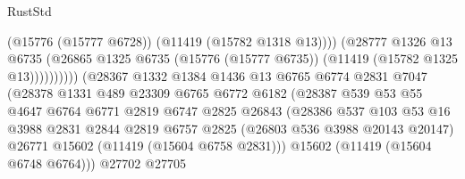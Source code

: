 \begin{lexlean}{RustStd}
\begin{coremodule}
                                              (@15776 (@15777 @6728))
                                              (@11419 (@15782 @1318 @13))))
                                          (@28777
                                            @1326
                                            @13
                                            @6735
                                            (@26865
                                              @1325
                                              @6735
                                              (@15776 (@15777 @6735))
                                              (@11419 (@15782 @1325 @13))))))))))
                              (@28367
                                @1332
                                @1384
                                @1436
                                @13
                                @6765
                                @6774
                                @2831
                                @7047
                                (@28378
                                  @1331
                                  @489
                                  @23309
                                  @6765
                                  @6772
                                  @6182
                                  (@28387
                                    @539
                                    @53
                                    @55
                                    @4647
                                    @6764
                                    @6771
                                    @2819
                                    @6747
                                    @2825
                                    @26843
                                    (@28386
                                      @537
                                      @103
                                      @53
                                      @16
                                      @3988
                                      @2831
                                      @2844
                                      @2819
                                      @6757
                                      @2825
                                      (@26803 @536 @3988 @20143 @20147)
                                      @26771
                                      @15602
                                      (@11419 (@15604 @6758 @2831)))
                                    @15602
                                    (@11419 (@15604 @6748 @6764)))
                                  @27702
                                  @27705

\end{coremodule}
\end{lexlean}
